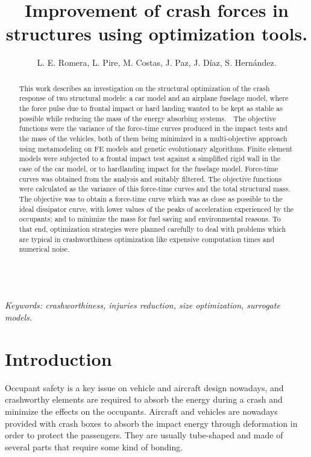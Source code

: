 \documentclass[cmfonts]{witpress}
\begin{document}
\title{Improvement of crash forces in structures using optimization tools.}

\author{L. E. Romera, L. Pire, M. Costas, J. Paz, J. D\'iaz, S. Hern\'andez.}

\address{Structural Mechanics Group, Universidade da Coru\~na, Spain.}

\maketitle

\begin{abstract}
This work describes an investigation on the structural optimization of the crash response of two structural models: a car model and an airplane fuselage model, where the force pulse due to frontal impact or hard landing wanted to be kept as stable as possible while reducing the mass of the energy absorbing systems.  The objective functions were the variance of the force-time curves produced in the impact tests and the mass of the vehicles, both of them being minimized in a multi-objective approach using metamodeling on FE models and genetic evolutionary algorithms. Finite element models were subjected to a frontal impact test against a simplified rigid wall in the case of the car model, or to hardlanding impact for the fuselage model. Force-time curves was obtained from the analysis and suitably filtered. The objective functions were calculated as the variance of this force-time curves and the total structural mass. The objective was to obtain a force-time curve which was as close as possible to the ideal dissipator curve, with lower values of the peaks of acceleration experienced by the occupants; and to minimize the mass for fuel saving and environmental reasons. To that end, optimization strategies were planned carefully to deal with problems which are typical in crashworthiness optimization like expensive computation times and numerical noise.
\end{abstract}\\
\emph{Keywords: crashworthiness, injuries reduction, size optimization, surrogate models.}

\section{Introduction}
Occupant safety is a key issue on vehicle and aircraft design nowadays, and crashworthy elements are required to absorb the energy during a crash and minimize the effects on the occupants. Aircraft and vehicles are nowadays provided with crash boxes to absorb the impact energy through deformation in order to protect the passengers. They are usually tube-shaped and made of several parts that require some kind of bonding.
\end{document}
